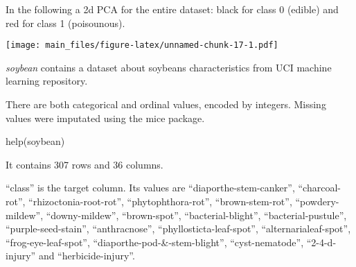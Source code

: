 \documentclass[
]{article}
\newenvironment{Shaded}{\begin{snugshade}}{\end{snugshade}}
\newcommand{\AttributeTok}[1]{\textcolor[rgb]{0.77,0.63,0.00}{#1}}
\newcommand{\DecValTok}[1]{\textcolor[rgb]{0.00,0.00,0.81}{#1}}
\newcommand{\FunctionTok}[1]{\textcolor[rgb]{0.00,0.00,0.00}{#1}}
\newcommand{\NormalTok}[1]{#1}
\newcommand{\OtherTok}[1]{\textcolor[rgb]{0.56,0.35,0.01}{#1}}
\newcommand{\SpecialCharTok}[1]{\textcolor[rgb]{0.00,0.00,0.00}{#1}}
\begin{document}
In the following a 2d PCA for the entire dataset: black for class 0
(edible) and red for class 1 (poisounous).

\begin{Shaded}
\end{Shaded}

\texttt{[image: main\_files/figure-latex/unnamed-chunk-17-1.pdf]}

\emph{soybean} contains a dataset about soybeans characteristics from
UCI machine learning repository.

There are both categorical and ordinal values, encoded by integers.
Missing values were imputated using the mice package.

\begin{Shaded}
\begin{Highlighting}[]
\FunctionTok{help}\NormalTok{(soybean)}
\end{Highlighting}
\end{Shaded}

It contains 307 rows and 36 columns.

``class'' is the target column. Its values are
``diaporthe-stem-canker'', ``charcoal-rot'', ``rhizoctonia-root-rot'',
``phytophthora-rot'', ``brown-stem-rot'', ``powdery-mildew'',
``downy-mildew'', ``brown-spot'', ``bacterial-blight'',
``bacterial-pustule'', ``purple-seed-stain'', ``anthracnose'',
``phyllosticta-leaf-spot'', ``alternarialeaf-spot'',
``frog-eye-leaf-spot'', ``diaporthe-pod-\&-stem-blight'',
``cyst-nematode'', ``2-4-d-injury'' and ``herbicide-injury''.
\end{document}
